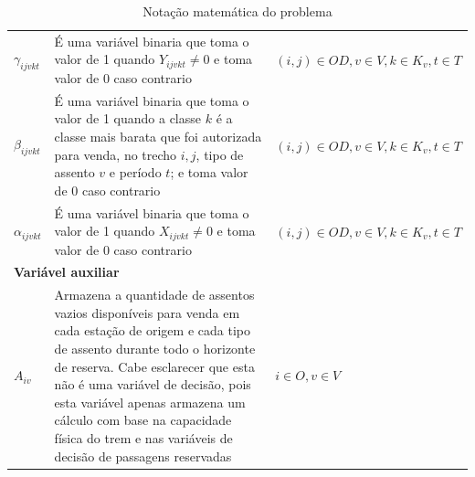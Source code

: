 \begin{table}[H]
\begin{tabular}{p{2cm} p{9.5cm} p{3.2cm}}
		$\gamma_{ijvkt}$       & É uma variável binaria que toma o valor de 1 quando $Y_{ijvkt} \neq 0$ e toma  valor de 0 caso contrario                                                                                                                                                                                                                                                                                                                      & $(i,j) \in OD, v \in V, k \in K_v, t \in T$ \\
		$\beta_{ijvkt}$       & É uma variável binaria que toma o valor de 1 quando a classe $k$ é a classe mais barata que foi autorizada para venda, no trecho $i,j$, tipo de assento $v$ e período $t$; e toma  valor de 0 caso contrario                                                                                                                                                                                                                                                                    & $(i,j) \in OD, v \in V, k \in K_v, t \in T$  \\
		$\alpha_{ijvkt}$       & É uma variável binaria que toma o valor de 1 quando $X_{ijvkt} \neq 0$ e toma  valor de 0 caso contrario                                                                                                                                                                                                                                                                                                                      & $(i,j) \in OD, v \in V, k \in K_v, t \in T$ \\
		\multicolumn{3}{l}{\textbf{Variável auxiliar}}                                                                                                                                                                                                                                                                                                                                                                                                                                                    \\ \midrule
		$A_{iv}$            & Armazena a quantidade de assentos vazios disponíveis para venda em cada estação de origem e cada tipo de assento durante todo o horizonte de reserva. Cabe esclarecer que esta não é uma variável de decisão, pois esta variável apenas armazena um cálculo com base na capacidade física do trem e nas variáveis de decisão de passagens reservadas                                                                                                          & $i \in O, v \in V$                                    \\
		\bottomrule
	\end{tabular}
	\caption{Notação matemática do problema}
	\label{tab: m1_definicao2}
\end{table}


